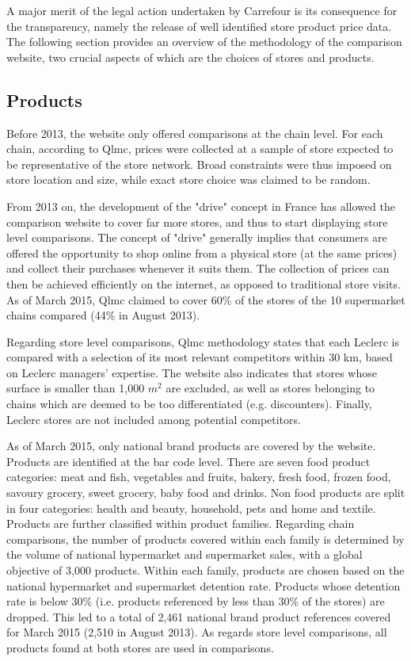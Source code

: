 \documentclass[english]{article}
\begin{document}
A major merit of the legal action undertaken by Carrefour is its consequence for the transparency, namely the release of well identified store product price data. The following section provides an overview of the methodology of the comparison website, two crucial aspects of which are the choices of stores and products.

\subsection{Products}

Before 2013, the website only offered comparisons at the chain level. For each chain, according to Qlmc, prices were collected at a sample of store expected to be representative of the store network. Broad constraints were thus imposed on store location and size, while exact store choice was claimed to be random.

From 2013 on, the development of the "drive" concept in France has allowed the comparison website to cover far more stores, and thus to start displaying store level comparisons. The concept of "drive" generally implies that consumers are offered the opportunity to shop online from a physical store (at the same prices) and collect their purchases whenever it suits them. The collection of prices can then be achieved efficiently on the internet, as opposed to traditional store visits. As of March 2015, Qlmc claimed to cover 60\% of the stores of the 10 supermarket chains compared (44\% in August 2013).

Regarding store level comparisons, Qlmc  methodology states that each Leclerc is compared with a selection of its most relevant competitors within 30 km, based on Leclerc managers' expertise. The website also indicates that stores whose surface is smaller than 1,000 $m^2$ are excluded, as well as stores belonging to chains which are deemed to be too differentiated (e.g. discounters). Finally, Leclerc stores are not included among potential competitors.

As of March 2015, only national brand products are covered by the website. Products are identified at the bar code level. There are seven food product categories: meat and fish, vegetables and fruits, bakery, fresh food, frozen food, savoury grocery, sweet grocery, baby food and drinks. Non food products are split in four categories: health and beauty, household, pets and home and textile. Products are further classified within product families. Regarding chain comparisons, the number of products covered within each family is determined by the volume of national hypermarket and supermarket sales, with a global objective of 3,000 products. Within each family, products are chosen based on the national hypermarket and supermarket detention rate. Products whose detention rate is below 30\% (i.e. products referenced by less than 30\% of the stores) are dropped. This led to a total of 2,461 national brand product references covered for March 2015 (2,510 in August 2013). As regards store level comparisons, all products found at both stores are used in comparisons.
\end{document}
